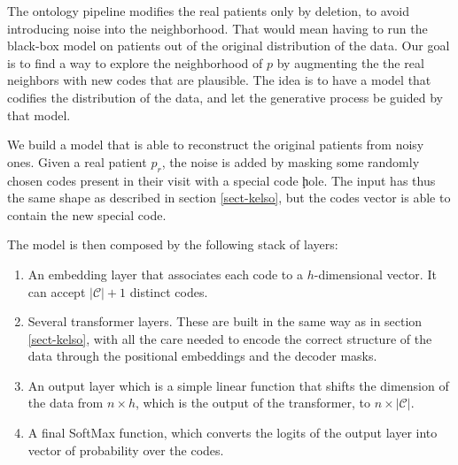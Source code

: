 \documentclass[]{marticle}
\newcommand{\codes}{\mathcal{C}}
\begin{document}
The ontology pipeline modifies the real patients only by deletion, to avoid introducing noise into
the neighborhood. That would mean having to run the black-box model on patients out of the original
distribution of the data. Our goal is to find a way to explore the neighborhood of $p$ by augmenting
the the real neighbors with new codes that are plausible. The idea is to have a model that codifies
the distribution of the data, and let the generative process be guided by that model.


We build a model that is able to reconstruct the original patients from noisy ones. Given a real
patient $p_r$, the noise is added by masking some randomly chosen codes present in their visit with
a special code \c{hole}. The input has thus the same shape as described in section \ref{sect-kelso},
but the codes vector is able to contain the new special code.

The model is then composed by the following stack of layers:
\begin{enumerate}
\item An embedding layer that associates each code to a $h$-dimensional vector. It can accept
$|\codes|+1$ distinct codes.

\item Several transformer layers. These are built in the same way as in section \ref{sect-kelso},
with all the care needed to encode the correct structure of the data through the positional
embeddings and the decoder masks.

\item An output layer which is a simple linear function that shifts the dimension of the data from
$n \times h$, which is the output of the transformer, to $n \times |\codes|$.

\item A final SoftMax function, which converts the logits of the output layer into vector of
probability over the codes.
\end{enumerate}
\end{document}
